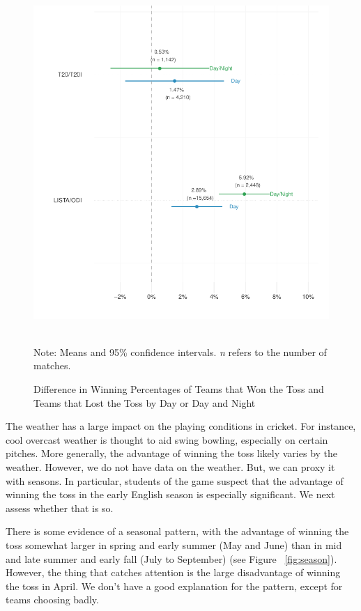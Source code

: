 \documentclass[12pt]{article}
\begin{document}
\begin{figure}[htbp]
\centering
\caption{Difference in Winning Percentages of Teams that Won the Toss and Teams that Lost the Toss by Day or Day and Night}
\includegraphics[scale=.95]{../figs/winbyDayNight.pdf}
{\footnotesize \\ Note: Means and 95\% confidence intervals. \emph{n} refers to the number of matches.\par}
\label{fig:dn}
\end{figure}

The weather has a large impact on the playing conditions in cricket. For instance, cool overcast weather is thought to aid swing bowling, especially on certain pitches. More generally, the advantage of winning the toss likely varies by the weather. However, we do not have data on the weather. But, we can proxy it with seasons. In particular, students of the game suspect that the advantage of winning the toss in the early English season is especially significant. We next assess whether that is so.

There is some evidence of a seasonal pattern, with the advantage of winning the toss somewhat larger in spring and early summer (May and June) than in mid and late summer and early fall (July to September) (see Figure ~\ref{fig:season}). However, the thing that catches attention is the large disadvantage of winning the toss in April. We don't have a good explanation for the pattern, except for teams choosing badly.  
\end{document}
